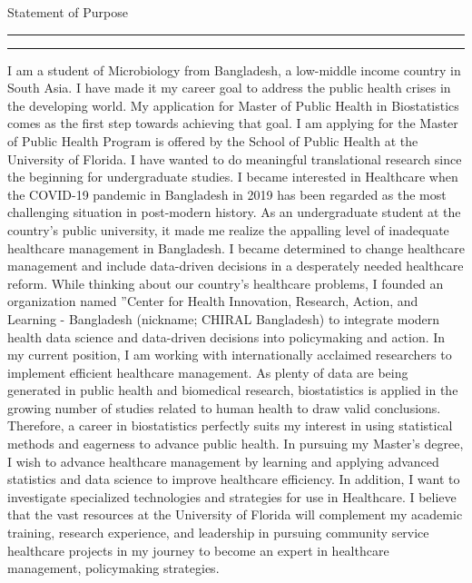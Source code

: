 \documentclass{article}
\newcommand{\soptitle}{Statement of Purpose}
\begin{document}
\begin{center}\LARGE\soptitle\\
\end{center}
\hrule
\vspace{1pt}
\hrule height 1pt
\bigskip

I am a student of Microbiology from Bangladesh, a low-middle income country in South Asia. I have made it my career goal to address the public health crises in the developing world. My application for Master of Public Health in Biostatistics comes as the first step towards achieving that goal. I am applying for the Master of Public Health Program is offered by the School of Public Health at the University of Florida. I have wanted to do meaningful translational research since the beginning for undergraduate studies. I became interested in Healthcare when the COVID-19 pandemic in Bangladesh in 2019 has been regarded as the most challenging situation in post-modern history. As an undergraduate student at the country’s public university, it made me realize the appalling level of inadequate healthcare management in Bangladesh. I became determined to change healthcare management and include data-driven decisions in a desperately needed healthcare reform. While thinking about our country’s healthcare problems, I founded an organization named ”Center for Health Innovation, Research, Action, and Learning - Bangladesh (nickname; CHIRAL Bangladesh) to integrate modern health data science and data-driven decisions into policymaking and action. In my current position, I am working with internationally acclaimed researchers to implement efficient healthcare management. As plenty of data are being generated in public health and biomedical research, biostatistics is applied in the growing number of studies related to human health to draw valid conclusions. Therefore, a career in biostatistics perfectly suits my interest in using statistical methods and eagerness to advance public health. In pursuing my Master’s degree, I wish to advance healthcare management by learning and applying advanced statistics and data science to improve healthcare efficiency. In addition, I want to investigate specialized technologies and strategies for use in Healthcare. I believe that the vast resources at the University of Florida will complement my academic training, research experience, and leadership in pursuing community service healthcare projects in my journey to become an expert in healthcare management, policymaking strategies. 
\end{document}
